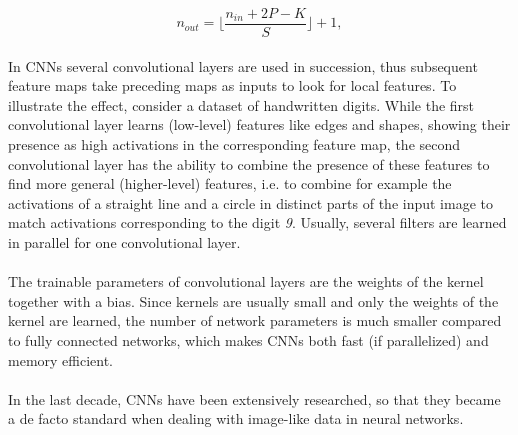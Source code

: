 \documentclass[../../main.tex]{subfiles}
\begin{document}
\begin{equation} \label{eq:conv}
	n_{out} = \bigg\lfloor\frac{n_{in}+2P-K}{S}\bigg\rfloor + 1,
\end{equation}
\\
In CNNs several convolutional layers are used in succession, thus subsequent feature maps take preceding maps as inputs to look for local features. To illustrate the effect, consider a dataset of handwritten digits. While the first convolutional layer learns (low-level) features like edges and shapes, showing their presence as high activations in the corresponding feature map, the second convolutional layer has the ability to combine the presence of these features to find more general (higher-level) features, i.e. to combine for example the activations of a straight line and a circle in distinct parts of the input image to match activations corresponding to the digit \textit{9}. Usually, several filters are learned in parallel for one convolutional layer.\\
\\
The trainable parameters of convolutional layers are the weights of the kernel together with a bias. Since kernels are usually small and only the weights of the kernel are learned, the number of network parameters is much smaller compared to fully connected networks, which makes CNNs both fast (if parallelized) and memory efficient.\\
\\
In the last decade, CNNs have been extensively researched, so that they became a de facto standard when dealing with image-like data in neural networks. 
\end{document}
